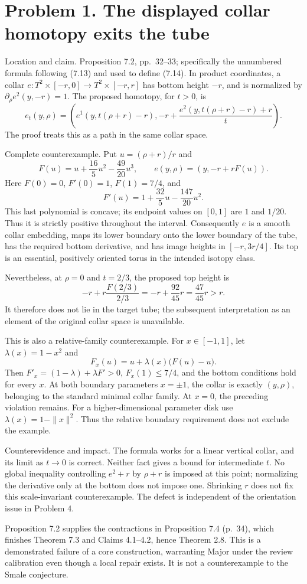 \documentclass[10pt]{article}
\begin{document}
\section*{Problem 1. The displayed collar homotopy exits the tube}
Location and claim. Proposition 7.2, pp. 32–33; specifically the unnumbered formula following (7.13) and used to define (7.14). In product coordinates, a collar \(e:T^2\times[-r,0]\to T^2\times[-r,r]\) has bottom height \(-r\), and is normalized by \(\partial_\rho e^2(y,-r)=1\). The proposed homotopy, for \(t>0\), is \[e_t(y,\rho)=\left(e^1(y,t(\rho+r)-r),
-r+\frac{e^2(y,t(\rho+r)-r)+r}{t}\right).\] The proof treats this as a path in the same collar space.\par
Complete counterexample. Put \(u=(\rho+r)/r\) and \[F(u)=u+\frac{16}{5}u^2-\frac{49}{20}u^3,\qquad
 e(y,\rho)=(y,-r+rF(u)).\] Here \(F(0)=0\), \(F'(0)=1\), \(F(1)=7/4\), and \[F'(u)=1+\frac{32}{5}u-\frac{147}{20}u^2.\] This last polynomial is concave; its endpoint values on \([0,1]\) are \(1\) and \(1/20\). Thus it is strictly positive throughout the interval. Consequently \(e\) is a smooth collar embedding, maps its lower boundary onto the lower boundary of the tube, has the required bottom derivative, and has image heights in \([-r,3r/4]\). Its top is an essential, positively oriented torus in the intended isotopy class.\par
Nevertheless, at \(\rho=0\) and \(t=2/3\), the proposed top height is \[-r+r\frac{F(2/3)}{2/3}
 =-r+\frac{92}{45}r
 =\frac{47}{45}r>r.\] It therefore does not lie in the target tube; the subsequent interpretation as an element of the original collar space is unavailable.\par
This is also a relative-family counterexample. For \(x\in[-1,1]\), let \(\lambda(x)=1-x^2\) and \[F_x(u)=u+\lambda(x)\bigl(F(u)-u\bigr).\] Then \(F'_x=(1-\lambda)+\lambda F'>0\), \(F_x(1)\le 7/4\), and the bottom conditions hold for every \(x\). At both boundary parameters \(x=\pm1\), the collar is exactly \((y,\rho)\), belonging to the standard minimal collar family. At \(x=0\), the preceding violation remains. For a higher-dimensional parameter disk use \(\lambda(x)=1-\|x\|^2\). Thus the relative boundary requirement does not exclude the example.\par
Counterevidence and impact. The formula works for a linear vertical collar, and its limit as \(t\to0\) is correct. Neither fact gives a bound for intermediate \(t\). No global inequality controlling \(e^2+r\) by \(\rho+r\) is imposed at this point; normalizing the derivative only at the bottom does not impose one. Shrinking \(r\) does not fix this scale-invariant counterexample. The defect is independent of the orientation issue in Problem 4.\par
Proposition 7.2 supplies the contractions in Proposition 7.4 (p. 34), which finishes Theorem 7.3 and Claims 4.1–4.2, hence Theorem 2.8. This is a demonstrated failure of a core construction, warranting Major under the review calibration even though a local repair exists. It is not a counterexample to the Smale conjecture.\par
\end{document}
